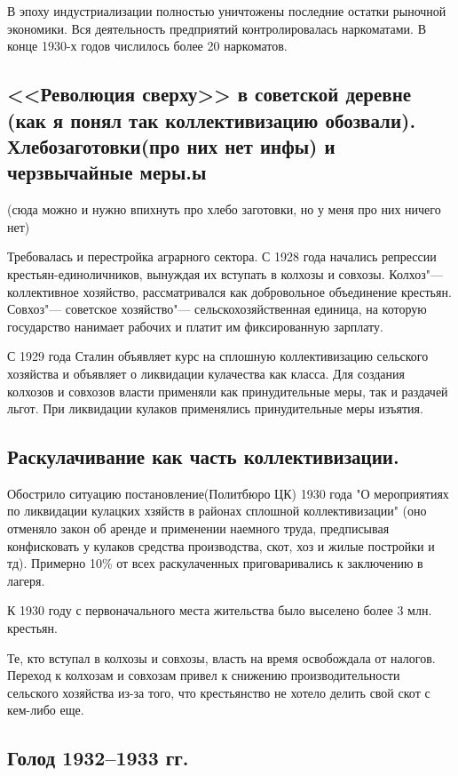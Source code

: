 В эпоху индустриализации полностью уничтожены последние остатки рыночной экономики. Вся деятельность предприятий контролировалась наркоматами. В конце 1930-х годов числилось более 20 наркоматов.


\subsection{<<Революция сверху>> в советской деревне (как я понял так коллективизацию обозвали). Хлебозаготовки(про них нет инфы) и черзвычайные меры.ы}

(сюда можно и нужно впихнуть про хлебо заготовки, но у меня про них ничего нет)

Требовалась и перестройка аграрного сектора. С 1928 года начались репрессии крестьян-единоличников, вынуждая их вступать в колхозы и совхозы. Колхоз"--- коллективное хозяйство, рассматривался как добровольное объединение крестьян. Совхоз"--- советское хозяйство"--- сельскохозяйственная единица, на которую государство нанимает рабочих и платит им фиксированную зарплату.

С 1929 года Сталин объявляет курс на сплошную коллективизацию сельского хозяйства и объявляет о ликвидации кулачества как класса. Для создания колхозов и совхозов власти применяли как принудительные меры, так и раздачей льгот. При ликвидации кулаков применялись принудительные меры изъятия.

\subsection{Раскулачивание как часть коллективизации.}

Обострило ситуацию постановление(Политбюро ЦК) 1930 года "О мероприятиях по ликвидации кулацких хзяйств в районах сплошной коллективизации" (оно отменяло закон об аренде и применении наемного труда, предписывая конфисковать у кулаков средства производства, скот, хоз и жилые постройки и тд). Примерно 10\% от всех раскулаченных приговаривались к заключению в лагеря.

К 1930 году с первоначального места жительства было выселено более 3 млн. крестьян.

Те, кто вступал в колхозы и совхозы, власть на время освобождала от налогов. Переход к колхозам и совхозам привел к снижению производительности сельского хозяйства из-за того, что крестьянство не хотело делить свой скот с кем-либо еще.

\subsection{Голод 1932--1933 гг.}

